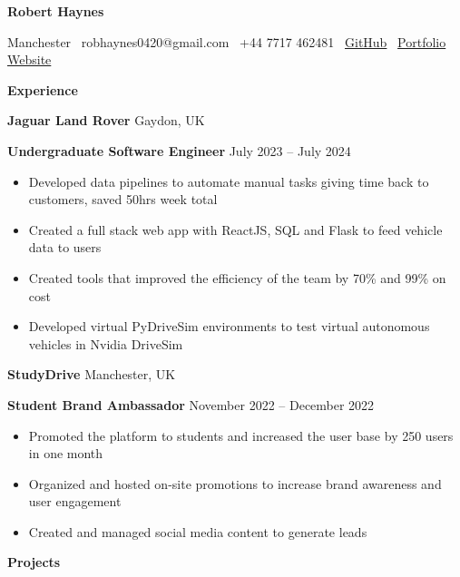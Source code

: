 \documentclass[11pt]{article}
\begin{document}
\begin{center}
    \textbf{Robert Haynes}\\ 
    \hrulefill
\end{center}

\begin{center}
    Manchester \textbullet \ robhaynes0420@gmail.com \textbullet \ +44 7717 462481 \textbullet \ \href{https://github.com/robbiehaynes}{GitHub} \textbullet \ \href{https://www.haynoway.com}{Portfolio Website}
\end{center}

\vspace{0.5pt}

\begin{center}
    \textbf{Experience}
\end{center}
\textbf{Jaguar Land Rover} \hfill Gaydon, UK

\textbf{Undergraduate Software Engineer} \hfill July 2023 – July 2024
\begin{itemize}[noitemsep, topsep=0pt, partopsep=0pt, parsep=0pt]
    \item Developed data pipelines to automate manual tasks giving time back to customers, saved 50hrs week total
    \item Created a full stack web app with ReactJS, SQL and Flask to feed vehicle data to users
    \item Created tools that improved the efficiency of the team by 70\% and 99\% on cost 
    \item Developed virtual PyDriveSim environments to test virtual autonomous vehicles in Nvidia DriveSim
\end{itemize}

\vspace{12pt}

\textbf{StudyDrive} \hfill Manchester, UK

\textbf{Student Brand Ambassador} \hfill November 2022 – December 2022
\begin{itemize}[noitemsep, topsep=0pt, partopsep=0pt, parsep=0pt]
    \item Promoted the platform to students and increased the user base by 250 users in one month
    \item Organized and hosted on-site promotions to increase brand awareness and user engagement
    \item Created and managed social media content to generate leads
\end{itemize}

\begin{center}
    \textbf{Projects}
\end{center}
\end{document}
